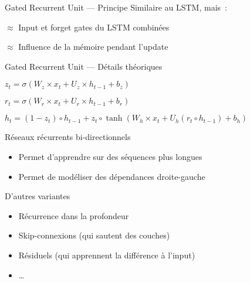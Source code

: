 \begin{frame}{Gated Recurrent Unit --- Principe}
  Similaire au LSTM, mais~:
  \begin{description}[<+->]
    \item[Update gate] $\approx$ Input et forget gates du LSTM combinées
    \item[Reset gate] $\approx$ Influence de la mémoire pendant l'update
  \end{description}
\end{frame}

\begin{frame}{Gated Recurrent Unit --- Détails théoriques}
  \begin{description}[<+->]
    \item[Update gate] $z_t = \sigma (W_z \times x_t + U_z \times h_{t - 1} + b_z)$
    \item[Reset gate] $r_t = \sigma (W_r \times x_t + U_r \times h_{t - 1} + b_r)$
    \item[Sortie] $h_t = (1 - z_t) \circ h_{t - 1} + z_t \circ \tanh(W_h \times x_t + U_h (r_t \circ h_{t - 1}) + b_h)$
  \end{description}
\end{frame}

\begin{frame}{Réseaux récurrents bi-directionnels}
  \begin{itemize}[<+->]
    \item Permet d'apprendre sur des séquences plus longues
    \item Permet de modéliser des dépendances droite-gauche
  \end{itemize}
\end{frame}

\begin{frame}{D'autres variantes}
  \begin{itemize}[<+->]
    \item Récurrence dans la profondeur
    \item Skip-connexions (qui sautent des couches)
    \item Résiduels (qui apprennent la différence à l'input)
    \item …
  \end{itemize}
\end{frame}
